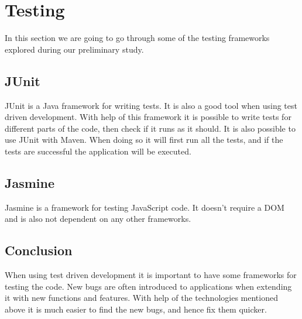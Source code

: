 \section{Testing}
\label{section:testing}

In this section we are going to go through some of the testing frameworks explored during our preliminary study.

\subsection{JUnit} \nocite{JUnit}

JUnit is a Java framework for writing tests. It is also a good tool when using test driven development.
With help of this framework it is possible to write tests for different parts of the code, then check if it runs as it should.
It is also possible to use JUnit with Maven.
When doing so it will first run all the tests, and if the tests are successful the application will be executed.

\subsection{Jasmine} \nocite{Jasmine}

Jasmine is a framework for testing JavaScript code.	
It doesn't require a DOM and is also not dependent on any other frameworks.

\subsection{Conclusion}

When using test driven development it is important to have some frameworks for testing the code.
New bugs are often introduced to applications when extending it with new functions and features.
With help of the technologies mentioned above it is much easier to find the new bugs, and hence fix them quicker.


